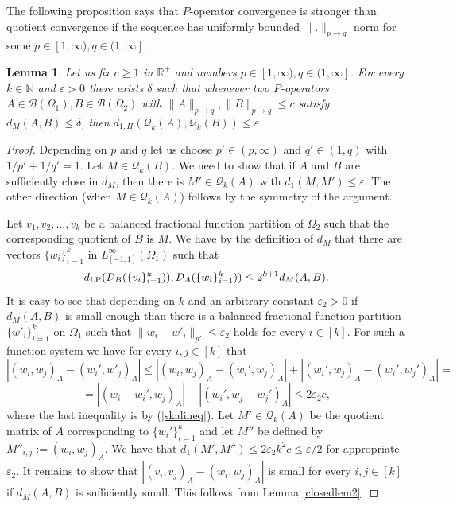 \documentclass[a4wider]{amsart}
\newtheorem{lemma}[theorem]{Lemma}
\theoremstyle{definitionbreak}\newtheorem{D}[theorem]{Definition}
\theoremstyle{definitionbreak}\newtheorem*{D*}{Definition}
\begin{document}
The following proposition says that $P$-operator convergence is stronger than quotient convergence if the sequence has uniformly bounded $\|.\|_{p\to q}$ norm for some $p\in [1,\infty),q\in (1,\infty]$.

\begin{lemma} Let us fix $c\geq 1$ in $\mathbb{R}^+$ and numbers $p\in [1,\infty),q\in (1,\infty]$. For every $k\in\mathbb{N}$ and $\varepsilon>0$ there exists $\delta$ such that whenever two $P$-operators $A\in\mathcal{B}(\Omega_1),B\in\mathcal{B}(\Omega_2)$ with $\|A\|_{p\to q},\|B\|_{p\to q}\leq c$ satisfy $d_M(A,B)\leq\delta$, then $d_{1,H}(\mathcal{Q}_k(A),\mathcal{Q}_k(B))\leq\varepsilon$. 
\end{lemma}

\begin{proof} Depending on $p$ and $q$ let us choose $p'\in (p,\infty)$ and $q'\in (1,q)$ with $1/p'+1/q'=1$. Let $M\in\mathcal{Q}_k(B)$. We need to show that if $A$ and $B$ are sufficiently close in $d_M$, then there is $M'\in\mathcal{Q}_k(A)$ with $d_1(M,M')\leq\varepsilon$. The other direction (when $M\in\mathcal{Q}_k(A)$) follows by the symmetry of the argument.

Let $v_1,v_2,\dots,v_k$ be a balanced fractional function partition of $\Omega_2$ such that the corresponding quotient of $B$ is $M$. We have by the definition of $d_M$ that there are vectors $\{w_i\}_{i=1}^k$ in $L^\infty_{[-1,1]}(\Omega_1)$ such that $$d_{\rm LP}(\mathcal{D}_B(\{v_i\}_{i=1}^k)),\mathcal{D}_A(\{w_i\}_{i=1}^k))\leq 2^{k+1}d_M(A,B).$$ It is easy to see that depending on $k$ and an arbitrary constant $\varepsilon_2>0$ if $d_M(A,B)$ is small enough than there is a balanced fractional function partition $\{w'_i\}_{i=1}^k$ on $\Omega_1$ such that $\|w_i-w'_i\|_{p'}\leq\varepsilon_2$ holds for every $i\in [k]$. For such a function system we have for every $i,j\in [k]$ that 
$$|(w_i,w_j)_A-(w_i',w'_j)_A|\leq |(w_i,w_j)_A-(w_i',w_j)_A|+|(w_i',w_j)_A-(w_i',w_j')_A|=$$ $$=|(w_i-w_i',w_j)_A|+|(w_i',w_j-w_j')_A|\leq 2\varepsilon_2c,$$ where the last inequality is by (\ref{skalineq}). Let $M'\in\mathcal{Q}_k(A)$ be the quotient matrix of $A$ corresponding to $\{w_i'\}_{i=1}^k$ and let $M''$ be defined by $M''_{i,j}:=(w_i,w_j)_A$. We have that $d_1(M',M'')\leq 2\varepsilon_2k^2c\leq\varepsilon/2$ for appropriate $\varepsilon_2$. It remains to show that $|(v_i,v_j)_A-(w_i,w_j)_A|$ is small for every $i,j\in [k]$ if $d_M(A,B)$ is sufficiently small. This follows from Lemma \ref{closedlem2}.
\end{proof}
\end{document}
